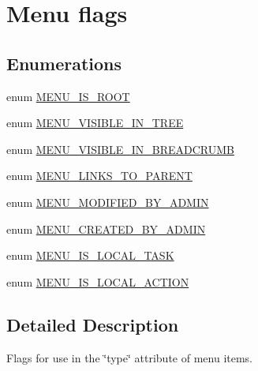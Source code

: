 \hypertarget{group__menu__flags}{
\section{Menu flags}
\label{group__menu__flags}
}
\subsection*{Enumerations}
\begin{DoxyCompactItemize}
\item 
enum \hyperlink{group__menu__flags_ga24354914e560f062f1999c2caddcb557}{MENU\_\-IS\_\-ROOT} 
\item 
enum \hyperlink{group__menu__flags_gac55f524092d03020a397d5622251de11}{MENU\_\-VISIBLE\_\-IN\_\-TREE} 
\item 
enum \hyperlink{group__menu__flags_ga401fd8a91b185414422e9258c44235c0}{MENU\_\-VISIBLE\_\-IN\_\-BREADCRUMB} 
\item 
enum \hyperlink{group__menu__flags_ga5ec2b7780807d41d9e691981976d51b1}{MENU\_\-LINKS\_\-TO\_\-PARENT} 
\item 
enum \hyperlink{group__menu__flags_ga784c1ff27202a1d2edafca310e15a0a1}{MENU\_\-MODIFIED\_\-BY\_\-ADMIN} 
\item 
enum \hyperlink{group__menu__flags_ga4e3c1ba9817162fc27cb19aeaa7d9373}{MENU\_\-CREATED\_\-BY\_\-ADMIN} 
\item 
enum \hyperlink{group__menu__flags_ga1dabe85b3ecd23eec02b20ef2d2f6259}{MENU\_\-IS\_\-LOCAL\_\-TASK} 
\item 
enum \hyperlink{group__menu__flags_ga91f0814c85a485d700a1955a00e2c0b8}{MENU\_\-IS\_\-LOCAL\_\-ACTION} 
\end{DoxyCompactItemize}


\subsection{Detailed Description}
Flags for use in the \char`\"{}type\char`\"{} attribute of menu items. 


